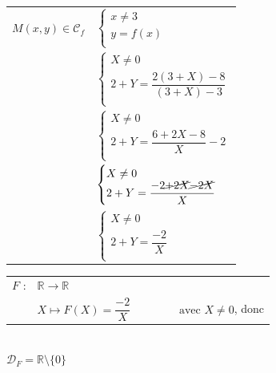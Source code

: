 \begin{enumerate}
\begin{tabular}{r@{$\Longleftrightarrow$}l}              
$M(x, y) \in \mathcal{C}_f$ & $\begin{cases}
                                  x \neq 3\\
                                  y = f(x)\\
                               \end{cases} $ \\
            & $\begin{cases}
                  X \neq 0\\
                  2 + Y = \dfrac{2(3 + X) -8 }{(3 + X) -3}\\
               \end{cases} $ \\
            & $\begin{cases}
                  X \neq 0\\
                  2 + Y = \dfrac{6 + 2X -8}{X} - 2 \\
               \end{cases} $ \\               
            & $\begin{cases}
                  X \neq 0\\
                  2 + Y = \dfrac{-2 \cancel{+ 2X} \cancel{- 2X}}{X} \\
               \end{cases} $ \\  
            & $\begin{cases}
                  X \neq 0\\
                  2 + Y = \dfrac{-2}{X} \\
               \end{cases} $ \\ 
\end{tabular} 
             
\begin{tabular}{l@{$\;$ }l}
  $F$ : & $ \mathbb{R} \longrightarrow \mathbb{R}$  \\
        & $ X \longmapsto F(X) = \dfrac{-2}{X} 
                  \qquad \qquad \text{ avec } X \neq 0$, donc \\
\end{tabular}\\

$ \mathscr{D}_F = \mathbb{R}\setminus\!\!\{0\}$ \\

\newpage
                      

\end{enumerate}
